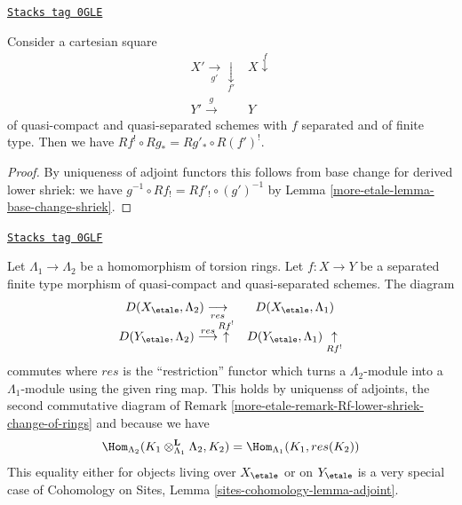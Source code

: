\begin{lemma}
\label{more-etale-lemma-cartesian-square-Rf-upper-shriek}
\href{https://stacks.math.columbia.edu/tag/0GLE}{\texttt{Stacks tag 0GLE}}

Consider a cartesian square
$$
\begin{array}{cc}X' \underset{g'}{\longrightarrow}\underset{f'}{\downarrow} & X \overset{f}{\downarrow} \\ Y' \overset{g}{\longrightarrow} & Y\end{array}
$$
of quasi-compact and quasi-separated schemes with $f$ separated and
of finite type. Then we have $Rf^! \circ Rg_* = Rg'_* \circ R(f')^!$.
\end{lemma}

\begin{proof}
By uniqueness of adjoint functors this follows from base change
for derived lower shriek: we have
$g^{-1} \circ Rf_! = Rf'_! \circ (g')^{-1}$ by
Lemma \ref{more-etale-lemma-base-change-shriek}.
\end{proof}

\begin{remark}
\label{more-etale-remark-Rf-upper-shriek-change-of-rings}
\href{https://stacks.math.columbia.edu/tag/0GLF}{\texttt{Stacks tag 0GLF}}

Let $\Lambda_1 \to \Lambda_2$ be a homomorphism of torsion rings.
Let $f : X \to Y$ be a separated finite type morphism of quasi-compact
and quasi-separated schemes. The diagram
$$
\begin{array}{cc}D(X_\etale, \Lambda_2) \underset{res}{\longrightarrow} & D(X_\etale, \Lambda_1) \\ D(Y_\etale, \Lambda_2) \overset{res}{\longrightarrow}\overset{Rf^!}{\uparrow} & D(Y_\etale, \Lambda_1) \underset{Rf^!}{\uparrow}\end{array}
$$
commutes where $res$ is the ``restriction'' functor which turns a
$\Lambda_2$-module into a $\Lambda_1$-module using the given ring map.
This holds by uniquenss of adjoints, the second commutative diagram
of Remark \ref{more-etale-remark-Rf-lower-shriek-change-of-rings} and because we have
$$
\Hom_{\Lambda_2}(K_1 \otimes_{\Lambda_1}^\mathbf{L} \Lambda_2, K_2) =
\Hom_{\Lambda_1}(K_1, res(K_2))
$$
This equality either for objects living over $X_\etale$ or on
$Y_\etale$ is a very special case of
Cohomology on Sites, Lemma \ref{sites-cohomology-lemma-adjoint}.
\end{remark}

